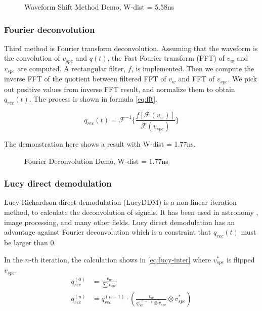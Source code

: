 \begin{figure}[H]
    \centering
    \scalebox{0.4}{}
    \caption{Waveform Shift Method Demo, W-dist = 5.58ns}
\end{figure}

\subsubsection{Fourier deconvolution}

Third method is Fourier transform deconvolution. Assuming that the waveform is the convolution of $v_{spe}$ and $q(t)$, the Fast Fourier transform (FFT) of $v_{w}$ and $v_{spe}$ are computed. A rectangular filter, $f$, is implemented. Then we compute the inverse FFT of the quotient between filtered FFT of $v_{w}$ and FFT of $v_{spe}$. We pick out positive values from inverse FFT result, and normalize them to obtain $q_{rec}(t)$. The process is shown in formula \eqref{eq:fft}. 

\begin{equation}
    q_{rec}(t) = \mathcal{F}^{-1}\{\frac{f[\mathcal{F}(v_{w})]}{\mathcal{F}(v_{spe})}\}
    \label{eq:fft}
\end{equation}

The demonstration here shows a result with W-dist = 1.77ns. 

\begin{figure}[H]
    \centering
    \scalebox{0.4}{}
    \caption{Fourier Deconvolution Demo, W-dist = 1.77ns}
\end{figure}

\subsubsection{Lucy direct demodulation}

Lucy-Richardson direct demodulation (LucyDDM) is a non-linear iteration method, to calculate the deconvolution of signals. It has been used in astronomy \cite{li_richardson-lucy_2019}, image processing, and many other fields. Lucy direct demodulation has an advantage against Fourier deconvolution which is a constraint that $q_{rec}(t)$ must be larger than 0. 

In the $n$-th iteration, the calculation shows in \eqref{eq:lucy-inter} where $v^{*}_{spe}$ is flipped $v_{spe}$. 
\begin{align}
    q_{rec}^{(0)} &= \frac{v_{w}}{\sum v_{spe}} \\
    q_{rec}^{(n)} &= q_{rec}^{(n-1)} \cdot \left(\frac{v_{w}}{q_{rec}^{(n-1)} \otimes v_{spe}} \otimes v^{*}_{spe}\right) \label{eq:lucy-inter}
\end{align}

